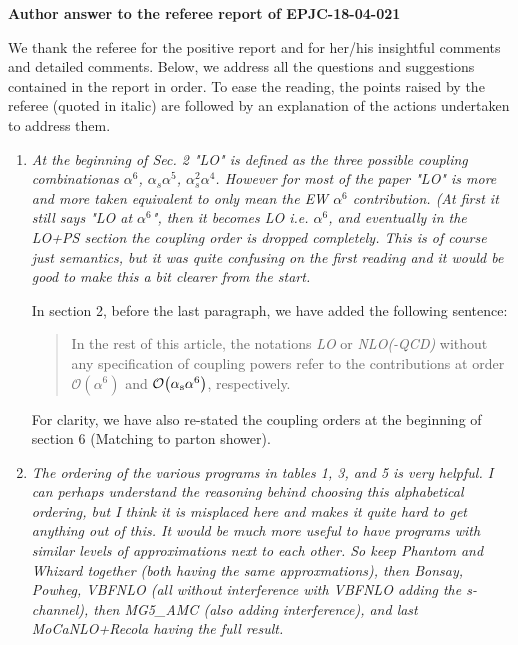 \documentclass{report}
\begin{document}
\noindent

\begin{center}
  \LARGE \textbf{Author answer to the referee report of EPJC-18-04-021}
\end{center}
\vspace{0.5cm}
We thank the referee for the positive report and for her/his insightful comments and detailed comments. Below, we address all the questions and suggestions contained in the report in order. To ease the reading, the points raised by the referee (quoted in italic) are followed by an  explanation of the actions undertaken to address them. 

\vspace{0.5cm}
\begin{enumerate}

    \item \emph{At the beginning of Sec. 2 "LO" is defined as the three possible coupling
combinationas $\alpha^6$, $\alpha_s \alpha^5$, $\alpha_s^2 \alpha^4$. However for most of the paper "LO" is more 
and more taken equivalent to only mean the EW $\alpha^6$ contribution. (At first it still says "LO at $\alpha^6$", 
then it becomes
LO i.e. $\alpha^6$, and eventually in the LO+PS section the coupling order is dropped completely. 
This is of course just semantics, but it was quite confusing on the first reading and it would be good to make this a bit clearer from the start.}

In section 2, before the last paragraph, we have added the following sentence:
\begin{quote}
In the rest of this article, the notations \emph{LO} or \emph{NLO(-QCD)} without any specification of coupling powers refer to the contributions at order $\mathcal{O}{\left(\alpha^{6}\right)}$ and $\mathcal{O}{\left(\alpha_{\rm s}\alpha^{6}\right)}$, respectively.  
\end{quote}
For clarity, we have also re-stated the coupling orders at the beginning of section 6 (Matching to parton shower).

    \item \emph{The ordering of the various programs in tables 1, 3, and 5 is very helpful.
I can perhaps understand the reasoning behind choosing this alphabetical
ordering, but I think it is misplaced here and makes it quite hard to get
anything out of this. It would be much more useful to have programs with similar levels of approximations next to each other. So keep Phantom and Whizard together (both having the same approxmations), then Bonsay, Powheg, VBFNLO (all without interference with VBFNLO adding the s-channel), then MG5\_AMC (also adding interference), and last MoCaNLO+Recola having the full result.}


\end{enumerate}
\end{document}
